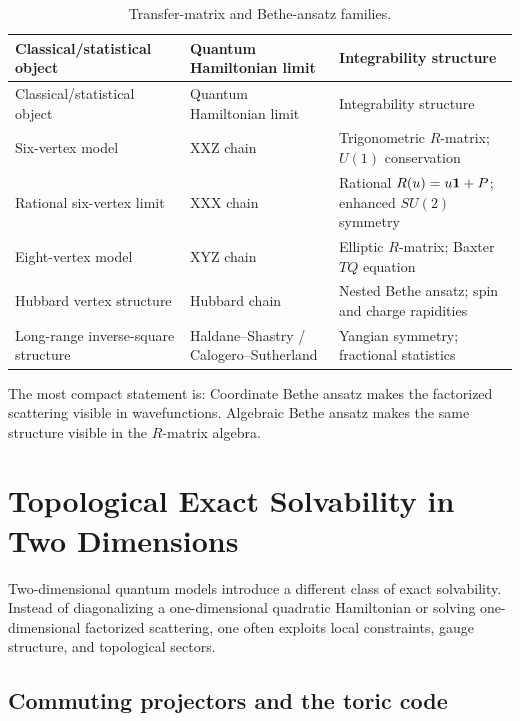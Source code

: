 \begin{longtable}{L{0.23\textwidth}L{0.23\textwidth}L{0.34\textwidth}}
\caption{Transfer-matrix and Bethe-ansatz families.}\label{tab:integrability-families}\\
\toprule
Classical/statistical object & Quantum Hamiltonian limit & Integrability structure \\
\midrule
\endfirsthead
\toprule
Classical/statistical object & Quantum Hamiltonian limit & Integrability structure \\
\midrule
\endhead
Six-vertex model & XXZ chain & Trigonometric \(R\)-matrix; \(U(1)\) conservation \\
Rational six-vertex limit & XXX chain & Rational \(R(u)=u\mathbf{1}+P\); enhanced \(SU(2)\) symmetry \\
Eight-vertex model & XYZ chain & Elliptic \(R\)-matrix; Baxter \(TQ\) equation \\
Hubbard vertex structure & Hubbard chain & Nested Bethe ansatz; spin and charge rapidities \\
Long-range inverse-square structure & Haldane--Shastry / Calogero--Sutherland & Yangian symmetry; fractional statistics \\
\bottomrule
\end{longtable}

The most compact statement is:
Coordinate Bethe ansatz makes the factorized scattering visible in wavefunctions.  Algebraic Bethe ansatz makes the same structure visible in the \(R\)-matrix algebra.

\section{Topological Exact Solvability in Two Dimensions}
\label{sec:topological-exact-solvability-synthesis}

Two-dimensional quantum models introduce a different class of exact solvability.  Instead of diagonalizing a one-dimensional quadratic Hamiltonian or solving one-dimensional factorized scattering, one often exploits local constraints, gauge structure, and topological sectors.

\subsection{Commuting projectors and the toric code}

